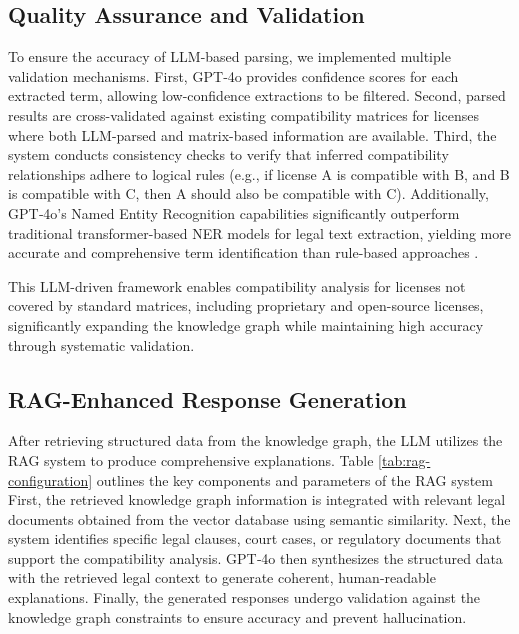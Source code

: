 \subsection{Quality Assurance and Validation}

To ensure the accuracy of LLM-based parsing, we implemented multiple validation mechanisms. First, GPT‑4o provides confidence scores for each extracted term, allowing low-confidence extractions to be filtered. Second, parsed results are cross-validated against existing compatibility matrices for licenses where both LLM-parsed and matrix-based information are available. Third, the system conducts consistency checks to verify that inferred compatibility relationships adhere to logical rules (e.g., if license A is compatible with B, and B is compatible with C, then A should also be compatible with C). Additionally, GPT‑4o’s Named Entity Recognition capabilities significantly outperform traditional transformer-based NER models \cite{devlin2018bert,liu2019roberta,zhang2020ner,liu2021legalner}for legal text extraction, yielding more accurate and comprehensive term identification than rule-based approaches \cite{zhang2024transformerner}.

This LLM-driven framework enables compatibility analysis for licenses not covered by standard matrices, including proprietary and open-source licenses, significantly expanding the knowledge graph while maintaining high accuracy through systematic validation.



\subsection{RAG-Enhanced Response Generation}

After retrieving structured data from the knowledge graph, the LLM utilizes the RAG system to produce comprehensive explanations.
Table \ref{tab:rag-configuration} outlines the key components and parameters of the RAG system
First, the retrieved knowledge graph information is integrated with relevant legal documents obtained from the vector database using semantic similarity. Next, the system identifies specific legal clauses, court cases, or regulatory documents that support the compatibility analysis. GPT‑4o then synthesizes the structured data with the retrieved legal context to generate coherent, human-readable explanations. Finally, the generated responses undergo validation against the knowledge graph constraints to ensure accuracy and prevent hallucination.




